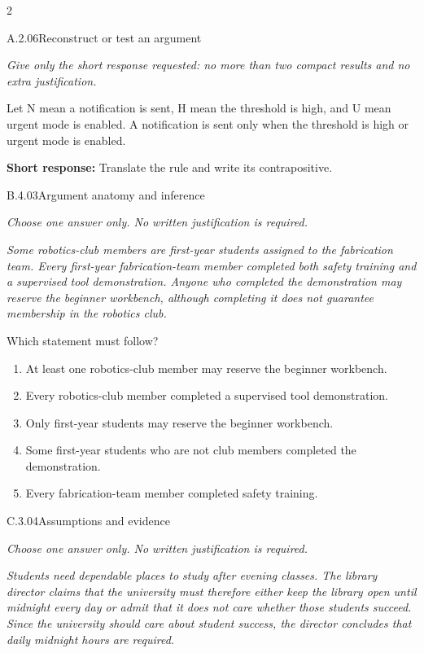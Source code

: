 \documentclass[9pt]{extarticle}
\newcommand{\choice}[1]{\item #1}
\begin{document}
\CoreWorkArea
\FormBreak
{}
\begin{multicols}{2}
\begin{DenseCoreProblem}{A.2.06}{Reconstruct or test an argument}
{\scriptsize\textit{Give only the short response requested: no more than two compact results and no extra justification.}\par}
Let N mean a notification is sent, H mean the threshold is high, and U mean urgent mode is enabled. A notification is sent only when the threshold is high or urgent mode is enabled.

\textbf{Short response:} Translate the rule and write its contrapositive.
\end{DenseCoreProblem}
\begin{DenseCoreProblem}{B.4.03}{Argument anatomy and inference}
{\scriptsize\textit{Choose one answer only. No written justification is required.}\par}
\emph{Some robotics-club members are first-year students assigned to the fabrication team. Every first-year fabrication-team member completed both safety training and a supervised tool demonstration. Anyone who completed the demonstration may reserve the beginner workbench, although completing it does not guarantee membership in the robotics club.}

Which statement must follow?
\begin{enumerate}[label=(\alph*)]
  \choice{At least one robotics-club member may reserve the beginner workbench.}
  \choice{Every robotics-club member completed a supervised tool demonstration.}
  \choice{Only first-year students may reserve the beginner workbench.}
  \choice{Some first-year students who are not club members completed the demonstration.}
  \choice{Every fabrication-team member completed safety training.}
\end{enumerate}
\end{DenseCoreProblem}
\columnbreak
\begin{DenseCoreProblem}{C.3.04}{Assumptions and evidence}
{\scriptsize\textit{Choose one answer only. No written justification is required.}\par}
\emph{Students need dependable places to study after evening classes. The library director claims that the university must therefore either keep the library open until midnight every day or admit that it does not care whether those students succeed. Since the university should care about student success, the director concludes that daily midnight hours are required.}


\end{DenseCoreProblem}
\end{multicols}
\end{document}
